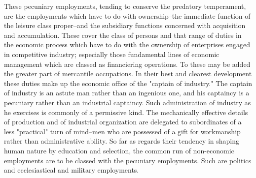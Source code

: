 \documentclass[12pt]{report}
\begin{document}
These pecuniary employments, tending to conserve the predatory
temperament, are the employments which have to do with ownership--the
immediate function of the leisure class proper--and the subsidiary
functions concerned with acquisition and accumulation. These cover the
class of persons and that range of duties in the economic process which
have to do with the ownership of enterprises engaged in competitive
industry; especially those fundamental lines of economic management
which are classed as financiering operations. To these may be added
the greater part of mercantile occupations. In their best and clearest
development these duties make up the economic office of the "captain
of industry." The captain of industry is an astute man rather than
an ingenious one, and his captaincy is a pecuniary rather than an
industrial captaincy. Such administration of industry as he exercises
is commonly of a permissive kind. The mechanically effective details of
production and of industrial organization are delegated to subordinates
of a less "practical" turn of mind--men who are possessed of a gift for
workmanship rather than administrative ability. So far as regards their
tendency in shaping human nature by education and selection, the common
run of non-economic employments are to be classed with the pecuniary
employments. Such are politics and ecclesiastical and military
employments.
\end{document}
